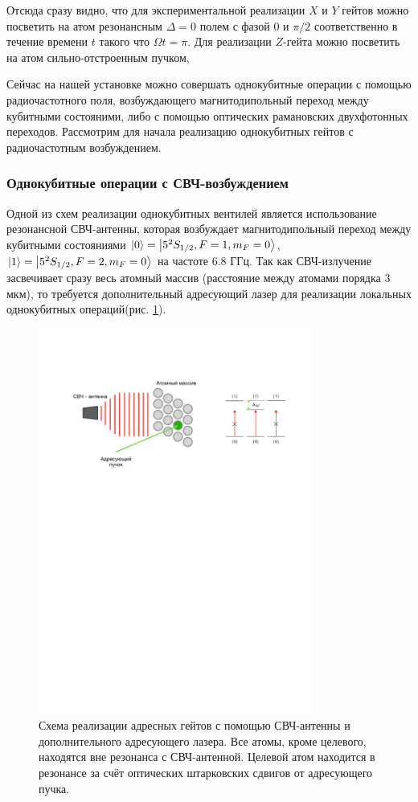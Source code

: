 Отсюда сразу видно, что для экспериментальной реализации $X$ и $Y$ гейтов можно посветить на атом резонансным $\Delta = 0$ полем с фазой $0$ и $\pi/2$ соответственно в течение времени $t$ такого что $\Omega t = \pi$. Для реализации $Z$-гейта можно посветить на атом сильно-отстроенным пучком, 

Сейчас на нашей установке можно совершать однокубитные операции с помощью радиочастотного поля, возбуждающего магнитодипольный переход между кубитными состояними, либо с помощью оптических рамановских двухфотонных переходов. Рассмотрим для начала реализацию однокубитных гейтов с радиочастотным возбуждением.

\subsubsection{Однокубитные операции с СВЧ-возбуждением}

Одной из схем реализации однокубитных вентилей является использование резонансной СВЧ-антенны, которая возбуждает магнитодипольный переход между кубитными состояниями $\left| 0 \right\rangle=\left| 5^2S_{1/2},F=1,m_F=0 \right\rangle$, $\left| 1 \right\rangle=\left| 5^2S_{1/2},F=2,m_F=0 \right\rangle$ на частоте $6.8 \text{ ГГц}$. Так как СВЧ-излучение засвечивает сразу весь атомный массив (расстояние между атомами порядка $3$ мкм), то требуется дополнительный адресующий лазер для реализации локальных однокубитных операций(рис. \ref{fig:shf_scheme}). 

\begin{figure}[ht]
	\centering
	\includegraphics[width=0.8\textwidth]{images/shf_gates.pdf}
	\caption{Схема реализации адресных гейтов с помощью СВЧ-антенны и дополнительного адресующего лазера. Все атомы, кроме целевого, находятся вне резонанса с СВЧ-антенной. Целевой атом находится в резонансе за счёт оптических штарковских сдвигов от адресующего пучка.}
	\label{fig:shf_scheme}
\end{figure}

